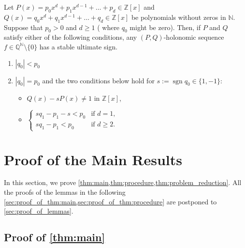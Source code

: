 \documentclass[a4paper,UKenglish,cleveref,autoref,thm-restate]{lipics-v2021}
\newcommand{\N}{\mathbb{N}}
\newcommand{\Q}{\mathbb{Q}}
\newcommand{\Z}{\mathbb{Z}}
\DeclareMathOperator{\sgn}{sgn}
\begin{document}
\begin{theorem}\label{thm:NOW21}
Let $P(x) = p_0 x^d + p_1 x^{d-1} + \dots + p_d \in \Z [x]$ and $Q(x) = q_0 x^d + q_1 x^{d-1} + \dots + q_d \in \Z [x]$ be polynomials without zeros in $\N$.  
Suppose that $p_0 > 0$ and $d \geq 1$ ( where $q_0$ might be zero). 
Then, if $P$ and $Q$ satisfy either of the following conditions, any $(P, Q)$-holonomic sequence $f \in \Q^{\N} \setminus \{ 0 \}$ has a stable ultimate sign. 
\begin{enumerate}[(1)]
\item\label{item:|q|<p} $|q_0| < p_0$
\item\label{item:|q|=p} $|q_0| = p_0$ and the two conditions below hold for $s := \sgn q_0 \in \{ 1, -1 \}$:
\begin{itemize}
\item $Q(x) - sP(x) \neq 1$ in $\Z[x]$, 
\item $\begin{cases}
sq_1 - p_1 - s < p_0 & \text{if $d=1$}, \\
sq_1 - p_1 < p_0 & \text{if $d \geq 2$}.
\end{cases}
$
\end{itemize}
\end{enumerate}
\end{theorem}





\section{Proof of the Main Results}\label{sec:proofs}

In this section, we prove \cref{thm:main,thm:procedure,thm:problem_reduction}. 
All the proofs of the lemmas in the following \cref{sec:proof_of_thm:main,sec:proof_of_thm:procedure} are postponed to \cref{sec:proof_of_lemmas}. 

\subsection{Proof of \cref{thm:main}} \label{sec:proof_of_thm:main}
\end{document}
